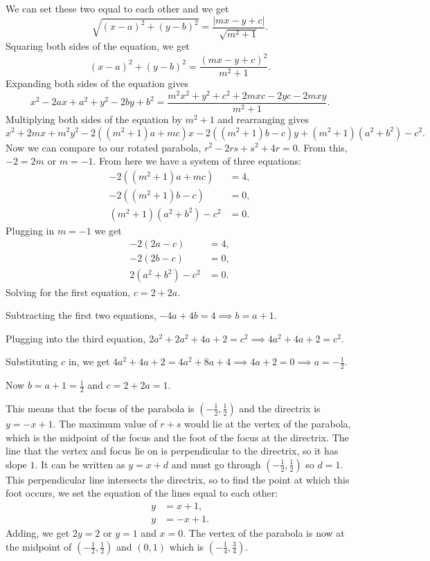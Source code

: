 \begin{enumerate}
 We can set these two equal to each other and we get 
 \[\sqrt{(x-a)^2+(y-b)^2} = \frac{|mx-y+c|}{\sqrt{m^2+1}}.\]Squaring both sides of the equation, we get 
 \[(x-a)^2+(y-b)^2 = \frac{(mx-y+c)^2}{m^2+1}.\]Expanding both sides of the equation gives 
 \[x^2-2ax+a^2+y^2-2by+b^2 = \frac{m^2x^2+y^2+c^2+2mxc-2yc-2mxy}{m^2+1}.\]Multiplying both sides of the equation by $m^2+1$ and rearranging gives 
 \[x^2+2mx+m^2y^2-2((m^2+1)a + mc)x-2((m^2+1)b - c)y +(m^2+1)(a^2+b^2)-c^2.\]Now we can compare to our rotated parabola, $r^2-2rs+s^2+4r = 0$. From this, $-2 = 2m$ or $m = -1$. From here we have a system of three equations:
 \begin{align*} -2((m^2+1)a + mc) &= 4, \\ -2((m^2+1)b - c) &= 0, \\ (m^2+1)(a^2+b^2)-c^2 &= 0. \end{align*}
Plugging in $m=-1$ we get
 \begin{align*} -2(2a-c) &= 4, \\ -2(2b-c) &= 0, \\ 2(a^2+b^2) - c^2 &= 0. \end{align*}
Solving for the first equation, $c = 2+2a$.

 Subtracting the first two equations, $-4a+4b = 4 \implies b = a+1$.

 Plugging into the third equation, $2a^2+2a^2+4a+2 = c^2 \implies 4a^2+4a+2 = c^2$.

 Substituting $c$ in, we get $4a^2+4a+2 = 4a^2+8a+4 \implies 4a+2 = 0 \implies a = -\frac{1}{2}$.

 Now $b = a+1 = \frac{1}{2}$ and $c = 2+2a = 1$.

 This means that the focus of the parabola is $\left(-\frac{1}{2}, \frac{1}{2}\right)$ and the directrix is $y = -x+1$. The maximum value of $r+s$ would lie at the vertex of the parabola, which is the midpoint of the focus and the foot of the focus at the directrix. The line that the vertex and focus lie on is perpendicular to the directrix, so it has slope $1$. It can be written as $y = x+d$ and must go through $\left(-\frac{1}{2}, \frac{1}{2}\right)$ so $d = 1$. This perpendicular line intersects the directrix, so to find the point at which this foot occurs, we set the equation of the lines equal to each other:
 \begin{align*} y &= x+1, \\ y &= -x+1. \end{align*}
Adding, we get $2y = 2$ or $y = 1$ and $x = 0$. The vertex of the parabola is now at the midpoint of $\left(-\frac{1}{2}, \frac{1}{2}\right)$ and $(0, 1)$ which is $\left(-\frac{1}{4}, \frac{3}{4}\right)$.


\end{enumerate}
